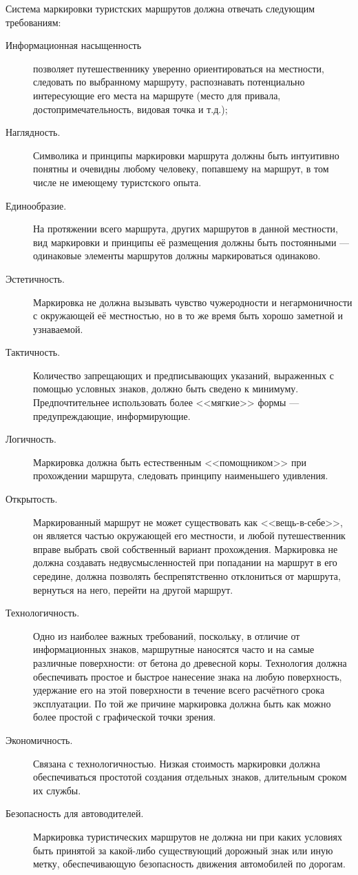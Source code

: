 \documentclass[a4paper,12pt,titlepage]{extarticle}
\begin{document}
Система маркировки туристских маршрутов должна отвечать следующим требованиям:
\begin{description}
	\item[Информационная насыщенность] позволяет путешественнику уверенно ориентироваться на местности, следовать по
		выбранному маршруту, распознавать потенциально интересующие его места на маршруте (место для привала,
		достопримечательность, видовая точка и т.д.);
	\item[Наглядность.] Символика и принципы маркировки маршрута должны быть интуитивно понятны и очевидны любому
		человеку, попавшему на маршрут, в том числе не имеющему туристского опыта.
	\item[Единообразие.] На протяжении всего маршрута, других маршрутов в данной местности, вид маркировки и
		принципы её размещения должны быть постоянными --- одинаковые элементы маршрутов должны маркироваться
		одинаково.
	\item[Эстетичность.] Маркировка не должна вызывать чувство чужеродности и негармоничности с окружающей её
		местностью, но в то же время быть хорошо заметной и узнаваемой.
	\item[Тактичность.] Количество запрещающих и предписывающих указаний, выраженных с помощью условных знаков,
		должно быть сведено к минимуму. Предпочтительнее использовать более <<мягкие>> формы ---
		предупреждающие, информирующие.
	\item[Логичность.] Маркировка должна быть естественным <<помощником>> при прохождении маршрута, следовать
		принципу наименьшего удивления.
	\item[Открытость.] Маркированный маршрут не может существовать как <<вещь-в-себе>>, он является частью окружающей
		его местности, и любой путешественник вправе выбрать свой собственный вариант прохождения. Маркировка не
		должна создавать недвусмысленностей при попадании на маршрут в его середине, должна позволять
		беспрепятственно отклониться от маршрута, вернуться на него, перейти на другой маршрут.
	\item[Технологичность.] Одно из наиболее важных требований, поскольку, в отличие от информационных знаков,
		маршрутные наносятся часто и на самые различные поверхности: от бетона до древесной коры.
		Технология должна обеспечивать простое и быстрое нанесение знака на любую поверхность, удержание его на
		этой поверхности в течение всего расчётного срока эксплуатации. По той же причине маркировка должна
		быть как можно более простой с графической точки зрения.
	\item[Экономичность.] Связана с технологичностью. Низкая стоимость маркировки должна обеспечиваться простотой
		создания отдельных знаков, длительным сроком их службы.
	\item[Безопасность для автоводителей.] Маркировка туристических маршрутов не должна ни при каких условиях быть
		принятой за какой-либо существующий дорожный знак или иную метку, обеспечивающую безопасность движения
		автомобилей по дорогам.
\end{description}
\end{document}
